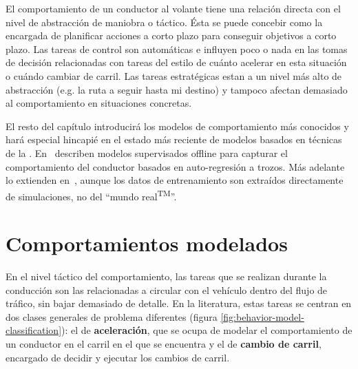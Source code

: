 El comportamiento de un conductor al volante tiene una relación directa con el nivel de abstracción de maniobra o táctico. Ésta se puede concebir como la encargada de planificar acciones a corto plazo para conseguir objetivos a corto plazo. Las tareas de control son automáticas e influyen poco o nada en las tomas de decisión relacionadas con tareas del estilo de cuánto acelerar en esta situación o cuándo cambiar de carril. Las tareas estratégicas estan a un nivel más alto de abstracción (e.g. la ruta a seguir hasta mi destino) y tampoco afectan demasiado al comportamiento en situaciones concretas.

El resto del capítulo introducirá los modelos de comportamiento más conocidos y hará especial hincapié en el estado más reciente de modelos basados en técnicas de la .
En~\cite{sekizawa2007modeling} describen modelos supervisados offline para capturar el comportamiento del conductor basados en auto-regresión a trozos. Más adelante lo extienden en~\cite{terada2010multi}, aunque los datos de entrenamiento son extraídos directamente de simulaciones, no del \enquote{mundo real\textsuperscript{TM}}.


\section{Comportamientos modelados}

En el nivel táctico del comportamiento, las tareas que se realizan durante la conducción son las relacionadas a circular con el vehículo dentro del flujo de tráfico, sin bajar demasiado de detalle. En la literatura, estas tareas se centran en dos clases generales de problema diferentes (figura \ref{fig:behavior-model-classification}): el de \textbf{aceleración}, que se ocupa de modelar el comportamiento de un conductor en el carril en el que se encuentra y el de \textbf{cambio de carril}, encargado de decidir y ejecutar los cambios de carril.

